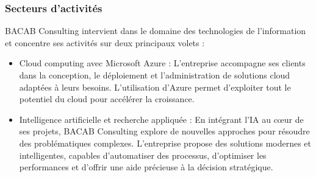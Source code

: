 \subsubsection{Secteurs d’activités}
BACAB Consulting intervient dans le domaine des technologies de l'information et concentre ses activités sur deux principaux volets :
\begin{itemize}[label=\textbullet]
    \item Cloud computing avec Microsoft Azure : L’entreprise accompagne ses clients dans la conception, le déploiement et l’administration de solutions cloud adaptées à leurs besoins. L’utilisation d’Azure permet d’exploiter tout le potentiel du cloud pour accélérer la croissance.
    \item Intelligence artificielle et recherche appliquée : En intégrant l’IA au cœur de ses projets, BACAB Consulting explore de nouvelles approches pour résoudre des problématiques complexes. L’entreprise propose des solutions modernes et intelligentes, capables d’automatiser des processus, d’optimiser les performances et d’offrir une aide précieuse à la décision stratégique.
\end{itemize}


